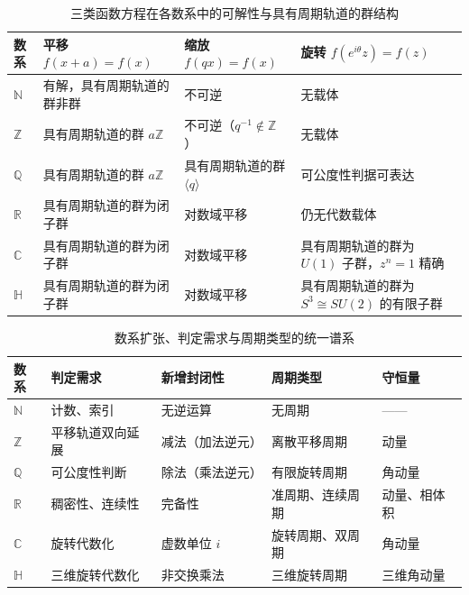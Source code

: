 \begin{table}[htbp]
\centering
\caption{三类函数方程在各数系中的可解性与具有周期轨道的群结构}
\label{tab:function_equation_solvability}
\small
\renewcommand{\arraystretch}{1.25}
\begin{tabular}{@{}>{\raggedright\arraybackslash}p{1.55cm}>{\raggedright\arraybackslash}p{3.6cm}>{\raggedright\arraybackslash}p{3.5cm}>{\raggedright\arraybackslash}p{5.05cm}@{}}
\toprule
\textbf{数系} & \textbf{平移 $f(x+a)=f(x)$} & \textbf{缩放 $f(qx)=f(x)$} & \textbf{旋转 $f(e^{i\theta}z)=f(z)$} \\
\midrule
$\mathbb{N}$ & 有解，具有周期轨道的群非群 & 不可逆 & 无载体 \\
$\mathbb{Z}$ & 具有周期轨道的群 $a\mathbb{Z}$ & 不可逆（$q^{-1}\notin\mathbb{Z}$） & 无载体 \\
$\mathbb{Q}$ & 具有周期轨道的群 $a\mathbb{Z}$ & 具有周期轨道的群 $\langle q\rangle$ & 可公度性判据可表达 \\
$\mathbb{R}$ & 具有周期轨道的群为闭子群 & 对数域平移 & 仍无代数载体 \\
$\mathbb{C}$ & 具有周期轨道的群为闭子群 & 对数域平移 & 具有周期轨道的群为 $U(1)$ 子群，$z^n=1$ 精确 \\
$\mathbb{H}$ & 具有周期轨道的群为闭子群 & 对数域平移 & 具有周期轨道的群为 $S^3\cong SU(2)$ 的有限子群 \\
\bottomrule
\end{tabular}
\end{table}

\begin{table}[htbp]
\centering
\caption{数系扩张、判定需求与周期类型的统一谱系}
\label{tab:number_system_period_spectrum}
\small
\begin{tabularx}{\textwidth}{@{}>{\raggedright\arraybackslash}p{1.6cm}
                  >{\raggedright\arraybackslash}X
                  >{\raggedright\arraybackslash}X
                  >{\raggedright\arraybackslash}X
                  >{\raggedright\arraybackslash}X@{}}
\toprule
\textbf{数系} & \textbf{判定需求} & \textbf{新增封闭性} & \textbf{周期类型} & \textbf{守恒量} \\
\midrule
$\mathbb{N}$ & 计数、索引 & 无逆运算 & 无周期 & —— \\
$\mathbb{Z}$ & 平移轨道双向延展 & 减法（加法逆元） & 离散平移周期 & 动量 \\
$\mathbb{Q}$ & 可公度性判断 & 除法（乘法逆元） & 有限旋转周期 & 角动量 \\
$\mathbb{R}$ & 稠密性、连续性 & 完备性 & 准周期、连续周期 & 动量、相体积 \\
$\mathbb{C}$ & 旋转代数化 & 虚数单位 $i$ & 旋转周期、双周期 & 角动量 \\
$\mathbb{H}$ & 三维旋转代数化 & 非交换乘法 & 三维旋转周期 & 三维角动量 \\
\bottomrule
\end{tabularx}
\end{table}

